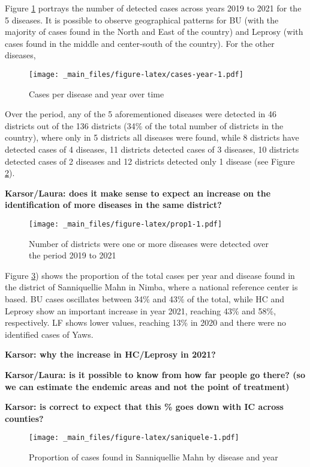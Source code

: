 \documentclass[
]{article}
\begin{document}
Figure \ref{fig:cases-year} portrays the number of detected cases across years 2019 to 2021 for the 5 diseases. It is possible to observe geographical patterns for BU (with the majority of cases found in the North and East of the country) and Leprosy (with cases found in the middle and center-south of the country). For the other diseases,

\begin{figure}
\centering
\texttt{[image: \_main\_files/figure-latex/cases-year-1.pdf]}
\caption{\label{fig:cases-year}Cases per disease and year over time}
\end{figure}

Over the period, any of the 5 aforementioned diseases were detected in 46 districts out of the 136 districts (34\% of the total number of districts in the country), where only in 5 districts all diseases were found, while 8 districts have detected cases of 4 diseases, 11 districts detected cases of 3 diseases, 10 districts detected cases of 2 diseases and 12 districts detected only 1 disease (see Figure \ref{fig:prop1}).

\textbf{Karsor/Laura: does it make sense to expect an increase on the identification of more diseases in the same district?}

\begin{figure}
\centering
\texttt{[image: \_main\_files/figure-latex/prop1-1.pdf]}
\caption{\label{fig:prop1}Number of districts were one or more diseases were detected over the period 2019 to 2021}
\end{figure}

Figure \ref{fig:saniquele}) shows the proportion of the total cases per year and disease found in the district of Sanniquellie Mahn in Nimba, where a national reference center is based. BU cases oscillates between 34\% and 43\% of the total, while HC and Leprosy show an important increase in year 2021, reaching 43\% and 58\%, respectively. LF shows lower values, reaching 13\% in 2020 and there were no identified cases of Yaws.

\textbf{Karsor: why the increase in HC/Leprosy in 2021?}

\textbf{Karsor/Laura: is it possible to know from how far people go there? (so we can estimate the endemic areas and not the point of treatment)}

\textbf{Karsor: is correct to expect that this \% goes down with IC across counties?}

\begin{figure}
\centering
\texttt{[image: \_main\_files/figure-latex/saniquele-1.pdf]}
\caption{\label{fig:saniquele}Proportion of cases found in Sanniquellie Mahn by disease and year}
\end{figure}
\end{document}
